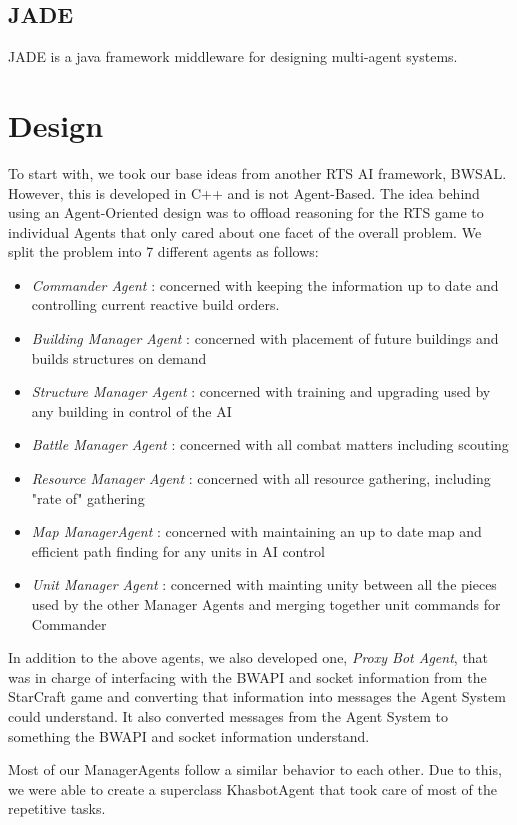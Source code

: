\documentclass[letterpaper]{article}
\begin{document}
\subsection{JADE}
JADE is a java framework middleware for designing multi-agent systems.

\section{Design}
To start with, we took our base ideas from another RTS AI framework, BWSAL.  However, this is developed in C++ and is not Agent-Based. The idea behind using an Agent-Oriented design was to offload reasoning for the RTS game to individual Agents that only cared about one facet of the overall problem.  We split the problem into 7 different agents as follows:
\begin{itemize}
\item \emph{Commander Agent} : concerned with keeping the information up to date and controlling current reactive build orders.
\item \emph{Building Manager Agent} :  concerned with placement of future buildings and builds structures on demand
\item \emph{Structure Manager Agent} : concerned with training and upgrading used by any building in control of the AI
\item \emph{Battle Manager Agent} : concerned with all combat matters including scouting
\item \emph{Resource Manager Agent} : concerned with all resource gathering, including "rate of" gathering
\item \emph{Map ManagerAgent} : concerned with maintaining an up to date map and efficient path finding for any units in AI control
\item \emph{Unit Manager Agent} : concerned with mainting unity between all the pieces used by the other Manager Agents and merging together unit commands for Commander
\end{itemize}

In addition to the above agents, we also developed one, \emph{Proxy Bot Agent}, that was in charge of interfacing with the BWAPI and socket information from the StarCraft game and converting that information into messages the Agent System could understand.  It also converted messages from the Agent System to something the BWAPI and socket information understand.

Most of our ManagerAgents follow a similar behavior to each other. Due to this, we were able to create a superclass KhasbotAgent that took care of most of the repetitive tasks.
\end{document}
